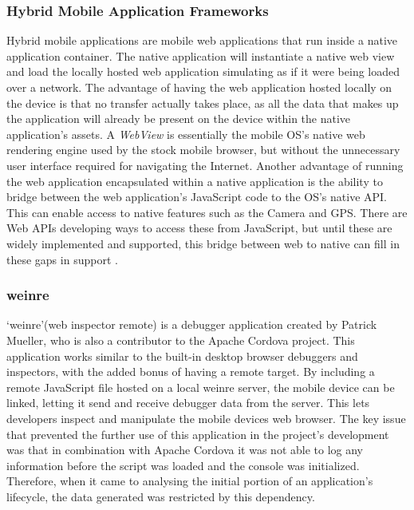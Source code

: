 \documentclass[final]{cmpreport}
\begin{document}
\subsubsection{Hybrid Mobile Application Frameworks}
Hybrid mobile applications are mobile web applications that run inside a native application container. The native application will instantiate a native web view and load the locally hosted web application simulating as if it were being loaded over a network. The advantage of having the web application hosted locally on the device is that no transfer actually takes place, as all the data that makes up the application will already be present on the device within the native application's assets. A \textit{WebView} is essentially the mobile OS's native web rendering engine used by the stock mobile browser, but without the unnecessary user interface required for navigating the Internet. Another advantage of running the web application encapsulated within a native application is the ability to bridge between the web application's JavaScript code to the OS's native API. This can enable access to native features such as the Camera and GPS. There are Web APIs developing ways to access these from JavaScript, but until these are widely implemented and supported, this bridge between web to native can fill in these gaps in support \citep{Smith}.

\subsubsection{weinre}
\label{sec:weinre}
`weinre'\footnotemark[24] (web inspector remote) is a debugger application created by Patrick Mueller\footnotemark[25], who is also a contributor to the Apache Cordova project. This application works similar to the built-in desktop browser debuggers and inspectors, with the added bonus of having a remote target. By including a remote JavaScript file hosted on a local weinre server, the mobile device can be linked, letting it send and receive debugger data from the server. This lets developers inspect and manipulate the mobile devices web browser. The key issue that prevented the further use of this application in the project's development was that in combination with Apache Cordova it was not able to log any information before the script was loaded and the console was initialized. Therefore, when it came to analysing the initial portion of an application's lifecycle, the data generated was restricted by this dependency.

\end{document}
